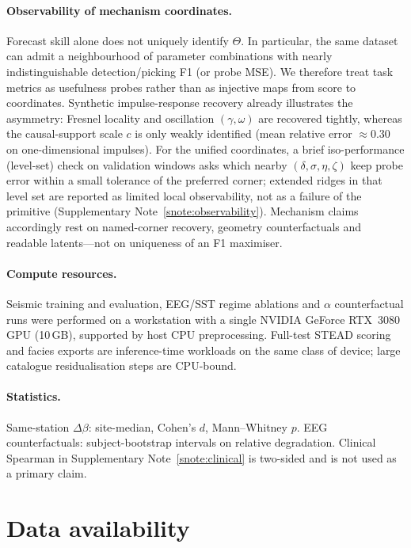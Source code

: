 \documentclass[twocolumn,10pt]{article}
\newcommand{\stead}{\textsc{STEAD}}
\begin{document}
\paragraph{Observability of mechanism coordinates.}
Forecast skill alone does not uniquely identify \(\Theta\). In particular, the
same dataset can admit a neighbourhood of parameter combinations with nearly
indistinguishable detection/picking F1 (or probe MSE). We therefore treat
task metrics as usefulness probes rather than as injective maps from score to
coordinates. Synthetic impulse-response recovery already illustrates the
asymmetry: Fresnel locality and oscillation \((\gamma,\omega)\) are recovered
tightly, whereas the causal-support scale \(c\) is only weakly identified
(mean relative error \(\approx0.30\) on one-dimensional impulses). For the
unified coordinates, a brief iso-performance (level-set) check on validation
windows asks which nearby \((\delta,\sigma,\eta,\zeta)\) keep probe error
within a small tolerance of the preferred corner; extended ridges in that
level set are reported as limited local observability, not as a failure of the
primitive (Supplementary Note~\ref{snote:observability}). Mechanism claims
accordingly rest on named-corner recovery, geometry counterfactuals and
readable latents---not on uniqueness of an F1 maximiser.

\paragraph{Compute resources.}
Seismic training and evaluation, EEG/SST regime ablations and \(\alpha\)
counterfactual runs were performed on a workstation with a single NVIDIA
GeForce RTX~3080 GPU (10\,GB), supported by host CPU preprocessing. Full-test
\stead{} scoring and facies exports are inference-time workloads on the same
class of device; large catalogue residualisation steps are CPU-bound.

\paragraph{Statistics.}
Same-station \(\Delta\beta\): site-median, Cohen's \(d\), Mann--Whitney \(p\).
EEG counterfactuals: subject-bootstrap intervals on relative degradation.
Clinical Spearman in Supplementary Note~\ref{snote:clinical} is two-sided and
is not used as a primary claim.

\section*{Data availability}
\end{document}
